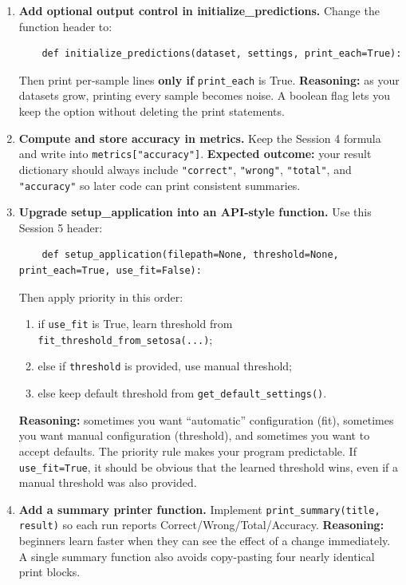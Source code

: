 \begin{enumerate}
    \item \textbf{Add optional output control in initialize\_predictions.}
    Change the function header to:
    \begin{verbatim}
    def initialize_predictions(dataset, settings, print_each=True):
    \end{verbatim}
    Then print per-sample lines \textbf{only if} \texttt{print\_each} is True.
    \noindent
    \textbf{Reasoning:} as your datasets grow, printing every sample becomes noise. A boolean flag lets you keep the option without deleting the print statements.

    \item \textbf{Compute and store accuracy in metrics.}
    Keep the Session 4 formula and write into \texttt{metrics["accuracy"]}.
    \noindent
    \textbf{Expected outcome:} your result dictionary should always include \texttt{"correct"}, \texttt{"wrong"}, \texttt{"total"}, and \texttt{"accuracy"} so later code can print consistent summaries.

    \item \textbf{Upgrade setup\_application into an API-style function.}
    Use this Session 5 header:
    \begin{verbatim}
    def setup_application(filepath=None, threshold=None, print_each=True, use_fit=False):
    \end{verbatim}
    Then apply priority in this order:
    \begin{enumerate}
        \item if \texttt{use\_fit} is True, learn threshold from \texttt{fit\_threshold\_from\_setosa(...)};
        \item else if \texttt{threshold} is provided, use manual threshold;
        \item else keep default threshold from \texttt{get\_default\_settings()}.
    \end{enumerate}
    \noindent
    \textbf{Reasoning:} sometimes you want ``automatic'' configuration (fit), sometimes you want manual configuration (threshold), and sometimes you want to accept defaults.
    The priority rule makes your program predictable. If \texttt{use\_fit=True}, it should be obvious that the learned threshold wins, even if a manual threshold was also provided.

    \item \textbf{Add a summary printer function.}
    Implement \texttt{print\_summary(title, result)} so each run reports Correct/Wrong/Total/Accuracy.
    \noindent
    \textbf{Reasoning:} beginners learn faster when they can see the effect of a change immediately.
    A single summary function also avoids copy-pasting four nearly identical print blocks.


\end{enumerate}
